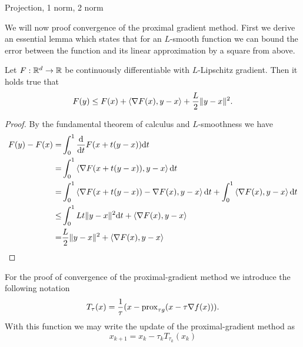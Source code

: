 \begin{example}
    Projection, 1 norm, 2 norm
\end{example}

We will now proof convergence of the proximal gradient method. First we derive an essential lemma which states that for an $L$-smooth function we can bound the error between the function and its linear approximation by a square from above.

\begin{lemma}\label{proximal_gradient:lemma:Lsmoothness}
    Let $F:\mathbb{R}^d\rightarrow \mathbb{R}$ be continuously differentiable with $L$-Lipschitz gradient. Then it holds true that 
    \begin{equation}
        F(y)\leq F(x) + \left\langle\nabla F(x) , y-x\right\rangle + \frac{L}{2}\|y-x\|^2.
    \end{equation}
\end{lemma}
\begin{proof}
    By the fundamental theorem of calculus and $L$-smoothness we have
    \begin{equation}
        \begin{aligned}
            F(y)-F(x) 
            =& \int_0^1 \frac{\mathrm{d}}{\mathrm{d} t}F(x+t(y-x))\mathrm{d} t\\
            =& \int_0^1\left\langle\nabla F(x+t(y-x)) , y-x\right\rangle\mathrm{d} t\\
            =& \int_0^1\left\langle\nabla F(x+t(y-x)) - \nabla F(x) , y-x\right\rangle\mathrm{d} t + \int_0^1\left\langle\nabla F(x) , y-x\right\rangle\mathrm{d} t\\
            \leq & \int_0^1L t \|y-x\|^2\mathrm{d} t + \left\langle\nabla F(x) , y-x\right\rangle\\
            = & \frac{L}{2} \|y-x\|^2 + \left\langle\nabla F(x) , y-x\right\rangle
        \end{aligned}
    \end{equation}
\end{proof}

For the proof of convergence of the proximal-gradient method we introduce the following notation
\begin{equation}
    T_\tau(x) = \frac{1}{\tau}(x-\mathrm{prox}_{\tau g}(x-\tau \nabla f(x))).
\end{equation}
With this function we may write the update of the proximal-gradient method as 
\begin{equation}
    x_{k+1} = x_k - \tau_k T_{\tau_k}(x_k)
\end{equation}

